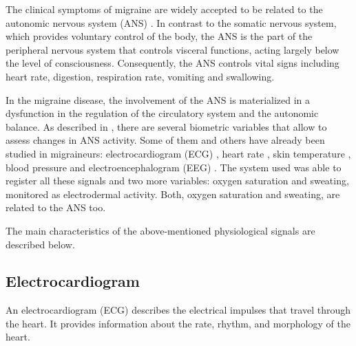 
\label{sec:setup:phys-signals}

The clinical symptoms of migraine are widely accepted to be related to
the autonomic nervous system (ANS) \cite{melek2007autonomic,
sanya2005impairment, barbanti2013dopaminergic, gass2013autonomic,
becker2013premonitory, hassinger1999cardiovascular}. In contrast to
the somatic nervous system, which provides voluntary control of the
body, the ANS is the part of the peripheral nervous system that
controls visceral functions, acting largely below the level of
consciousness. Consequently, the ANS controls vital signs including
heart rate, digestion, respiration rate, vomiting and swallowing.


In the migraine disease, the involvement of the ANS is materialized in
a dysfunction in the regulation of the circulatory system and the
autonomic balance. As described in \cite{mendes2009assessing}, there
are several biometric variables that allow to assess changes in ANS
activity. Some of them and others have already been studied in
migraineurs: electrocardiogram (ECG) \cite{melek2007autonomic,
aygun2003electrocardiographic}, heart rate \cite{pmid23853566,
pmid19925627}, skin temperature \cite{zaproudina2013acral,
ordas2013increase}, blood pressure \cite{pietrini2005hypertension,
pmid19925627} and electroencephalogram
(EEG) \cite{bjork2011initiates}. The system used was able to register
all these signals and two more variables: oxygen saturation and
sweating, monitored as electrodermal activity. Both, oxygen saturation
and sweating, are related to the ANS too.

The main characteristics of the above-mentioned physiological signals
are described below.

\subsection{Electrocardiogram}
\label{subsec:setup:phys-signals:ecg}

An electrocardiogram (ECG) describes the electrical impulses that
travel through the heart. It provides information about the rate,
rhythm, and morphology of the heart.

